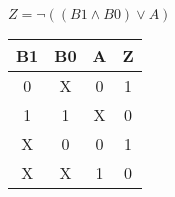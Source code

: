 
\begin{center}
    {\(Z = \lnot ((B1 \land B0) \lor A) \)}
    \begin{table}[h] %
        \begin{center}
            \begin{tabular}{|c|c|c||c|} \hline
            B1 & B0 & A & Z \\ \hline\hline
            0  & X  & 0 & 1 \\ \hline
            1  & 1  & X & 0 \\ \hline
            X  & 0  & 0 & 1 \\ \hline
            X  & X  & 1 & 0 \\ \hline
            \end{tabular}
        \end{center}
    \end{table}
\end{center}
